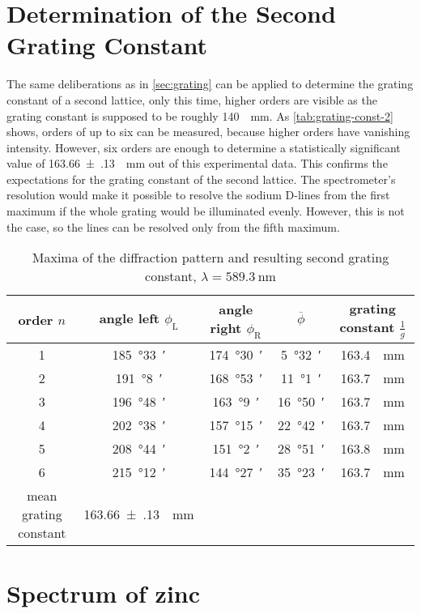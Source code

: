 \section{Determination of the Second Grating Constant}
The same deliberations as in \autoref{sec:grating} can be applied to determine the grating constant of a second lattice, only this time, higher orders are visible as the grating constant is supposed to be roughly \SI{140}{\per\mm}.
As \autoref{tab:grating-const-2} shows, orders of up to six can be measured, because higher orders have vanishing intensity.
However, six orders are enough to determine a statistically significant value of \SI{163.66(13)}{\per\mm} out of this experimental data.
This confirms the expectations for the grating constant of the second lattice.
The spectrometer's resolution would make it possible to resolve the sodium D-lines from the first maximum if the whole grating would be illuminated evenly.
However, this is not the case, so the lines can be resolved only from the fifth maximum.
\begin{table}[b!]
	\centering
	\caption[Maxima of the diffraction pattern and resulting second grating constant]{Maxima of the diffraction pattern and resulting second grating constant, $\lambda=\SI{589.3}{\nm}$}
	\label{tab:grating-const-2}
	\begin{tabular}{S|SSS|S}
		\toprule
		{order $n$}	&	{angle left $\phi_\text{L}$}	&	{angle right $\phi_\text{R}$}	&	{$\overline{\phi}$}	&	{grating constant $\frac{1}{g}$}\\
			&	\SI{185}{\degree}\SI{33}{\arcminute}	&	\SI{174}{\degree}\SI{30}{\arcminute}	&	\SI{5}{\degree}\SI{32}{\arcminute}	&	\SI{163.4}{\per\mm}	\\
		2	&	\SI{191}{\degree}\SI{8}{\arcminute}	&	\SI{168}{\degree}\SI{53}{\arcminute}	&	\SI{11}{\degree}\SI{1}{\arcminute}	&	\SI{163.7}{\per\mm}	\\
		3	&	\SI{196}{\degree}\SI{48}{\arcminute}	&	\SI{163}{\degree}\SI{9}{\arcminute}	&	\SI{16}{\degree}\SI{50}{\arcminute}	&	\SI{163.7}{\per\mm}	\\
		4	& \SI{202}{\degree}\SI{38}{\arcminute}	&	\SI{157}{\degree}\SI{15}{\arcminute}	&	\SI{22}{\degree}\SI{42}{\arcminute}	&	\SI{163.7}{\per\mm}	\\
		5	&	\SI{208}{\degree}\SI{44}{\arcminute}	&	\SI{151}{\degree}\SI{2}{\arcminute}	&	\SI{28}{\degree}\SI{51}{\arcminute}	&	\SI{163.8}{\per\mm}	\\
		6	&	\SI{215}{\degree}\SI{12}{\arcminute}	&	\SI{144}{\degree}\SI{27}{\arcminute}	&	\SI{35}{\degree}\SI{23}{\arcminute}	&	\SI{163.7}{\per\mm}	\\
		\midrule
		{mean grating constant}	&	\SI{163.66(13)}{\per\mm}\\
		\bottomrule
	\end{tabular}
\end{table}

\section{Spectrum of zinc}
